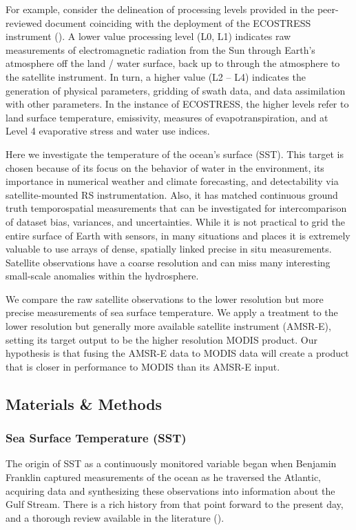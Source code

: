 \begin{refsection}
For example, consider the delineation of processing levels provided in the peer-reviewed document coinciding with the deployment of the ECOSTRESS instrument (\cite{fisher2020ecostress}). A lower value processing level (L0, L1) indicates raw measurements of electromagnetic radiation from the Sun through Earth’s atmosphere off the land / water surface, back up to through the atmosphere to the satellite instrument. In turn, a higher value (L2 – L4) indicates the generation of physical parameters, gridding of swath data, and data assimilation with other parameters. In the instance of ECOSTRESS, the higher levels refer to land surface temperature, emissivity, measures of evapotranspiration, and at Level 4 evaporative stress and water use indices.

Here we investigate the temperature of the ocean’s surface (SST). This target is chosen because of its focus on the behavior of water in the environment, its importance in numerical weather and climate forecasting, and detectability via satellite-mounted RS instrumentation. Also, it has matched continuous ground truth temporospatial measurements that can be investigated for intercomparison of dataset bias, variances, and uncertainties. While it is not practical to grid the entire surface of Earth with sensors, in many situations and places it is extremely valuable to use arrays of dense, spatially linked precise in situ measurements. Satellite observations have a coarse resolution and can miss many interesting small-scale anomalies within the hydrosphere. 

We compare the raw satellite observations to the lower resolution but more precise measurements of sea surface temperature. We apply a treatment to the lower resolution but generally more available satellite instrument (AMSR-E), setting its target output to be the higher resolution MODIS product. Our hypothesis is that fusing the AMSR-E data to MODIS data will create a product that is closer in performance to MODIS than its AMSR-E input. 

\subsection{Materials \& Methods}
\subsubsection{Sea Surface Temperature (SST)}
The origin of SST as a continuously monitored variable began when Benjamin Franklin captured measurements of the ocean as he traversed the Atlantic, acquiring data and synthesizing these observations into information about the Gulf Stream. There is a rich history from that point forward to the present day, and a thorough review available in the literature (\cite{minnett2019half}).


\end{refsection}
